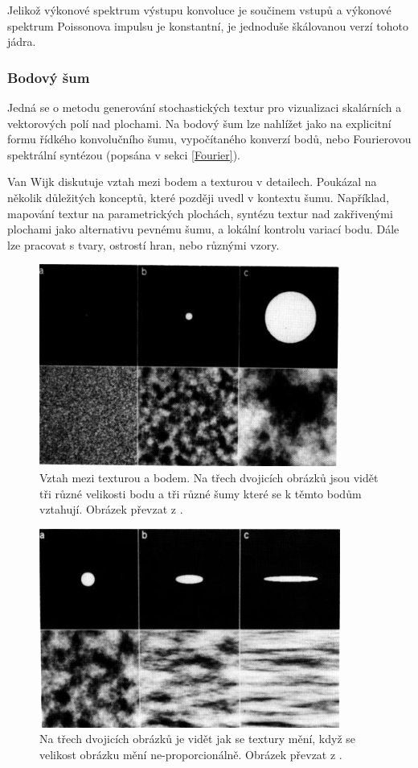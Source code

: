 Jelikož výkonové spektrum výstupu konvoluce je součinem vstupů a výkonové spektrum Poissonova impulsu je konstantní, je jednoduše škálovanou verzí tohoto jádra.

\subsubsection{Bodový šum}
\label{SpotNoise}
Jedná se o metodu generování stochastických textur pro vizualizaci skalárních a vektorových polí nad plochami. Na bodový šum lze nahlížet jako na explicitní formu řídkého konvolučního šumu, vypočítaného konverzí bodů, nebo Fourierovou spektrální syntézou (popsána v sekci \ref{Fourier}).

Van Wijk \cite{Wijk91} diskutuje vztah mezi bodem a texturou v detailech. Poukázal na několik důležitých konceptů, které později uvedl v kontextu šumu. Například, mapování textur na parametrických plochách, syntézu textur nad zakřivenými plochami jako alternativu pevnému šumu, a lokální kontrolu variací bodu. Dále lze pracovat s tvary, ostrostí hran, nebo různými vzory.

\begin{figure}[H]
	\centering
	\includegraphics[scale=0.7]{obrazky-figures/SpotNoiseSize.png}
	\caption{Vztah mezi texturou a bodem. Na třech dvojicích obrázků jsou vidět tři různé velikosti bodu a tři různé šumy které se k těmto bodům vztahují. Obrázek převzat z \cite{Wijk91}.}
	\label{fig:SpotNoise}
\end{figure}
\begin{figure}[H]
	\centering
	\includegraphics[scale=0.7]{obrazky-figures/SpotNoiseNonProportional.png}
	\caption{Na třech dvojicích obrázků je vidět jak se textury mění, když se velikost obrázku mění ne-proporcionálně. Obrázek převzat z \cite{Wijk91}.}
	\label{fig:SpotNoiseNonProportional}
\end{figure}

